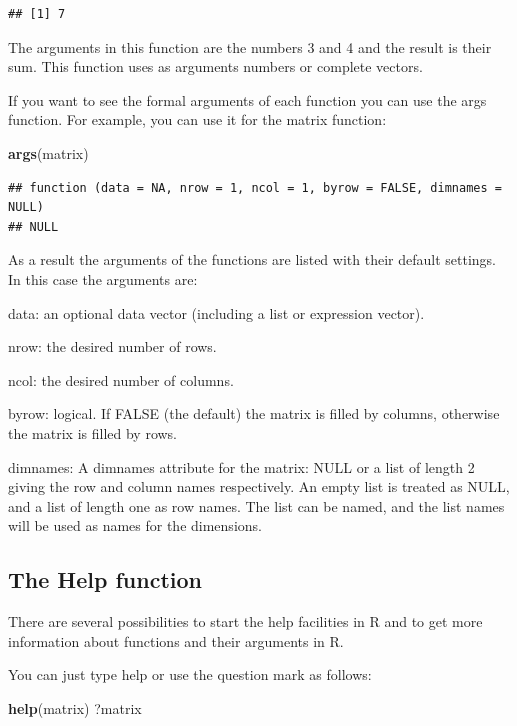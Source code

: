 \documentclass[]{book}
\newenvironment{Shaded}{\begin{snugshade}}{\end{snugshade}}
\newcommand{\KeywordTok}[1]{\textcolor[rgb]{0.13,0.29,0.53}{\textbf{#1}}}
\newcommand{\NormalTok}[1]{#1}
\begin{document}
\begin{verbatim}
## [1] 7
\end{verbatim}

The arguments in this function are the numbers 3 and 4 and the result is
their sum. This function uses as arguments numbers or complete vectors.

If you want to see the formal arguments of each function you can use the
args function. For example, you can use it for the matrix function:

\begin{Shaded}
\begin{Highlighting}[]
\KeywordTok{args}\NormalTok{(matrix)}
\end{Highlighting}
\end{Shaded}

\begin{verbatim}
## function (data = NA, nrow = 1, ncol = 1, byrow = FALSE, dimnames = NULL) 
## NULL
\end{verbatim}

As a result the arguments of the functions are listed with their default
settings. In this case the arguments are:

data: an optional data vector (including a list or expression vector).

nrow: the desired number of rows.

ncol: the desired number of columns.

byrow: logical. If FALSE (the default) the matrix is filled by columns,
otherwise the matrix is filled by rows.

dimnames: A dimnames attribute for the matrix: NULL or a list of length
2 giving the row and column names respectively. An empty list is treated
as NULL, and a list of length one as row names. The list can be named,
and the list names will be used as names for the dimensions.

\subsection{The Help function}\label{the-help-function}

There are several possibilities to start the help facilities in R and to
get more information about functions and their arguments in R.

You can just type help or use the question mark as follows:

\begin{Shaded}
\begin{Highlighting}[]
\KeywordTok{help}\NormalTok{(matrix)}
\NormalTok{?matrix}
\end{Highlighting}
\end{Shaded}
\end{document}
